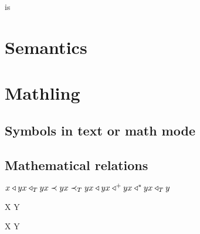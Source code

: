\documentclass{kharticle}
\begin{document}
\begin{examplebox}
\end{examplebox}

\begin{examplebox}
 is 
\end{examplebox}


\section{Semantics}

\begin{examplebox}
 \par
\typeet \par
\typeeet \par
\typeett \par
\typeetet
\end{examplebox}

\begin{examplebox}
\end{examplebox}


\section{Mathling}

\subsection{Symbols in text or math mode}

\begin{examplebox}
    \ledge \redge \tedge \bedge \slot
\end{examplebox}

\subsection{Mathematical relations}

\begin{examplebox}
\begin{math}
x \triangleleft y \\
x \triangleleft_T y \\
x \prec y \\
x \prec_T y \\
x \triangleleft y \\
x \triangleleft^+ y \\
x \triangleleft^* y \\
x \triangleleft_T y \\
\end{math}
\end{examplebox}

\begin{examplebox}
 \par
{} \par
X \mergedot Y \par
X \movedot Y \par
\end{examplebox}
\end{document}
